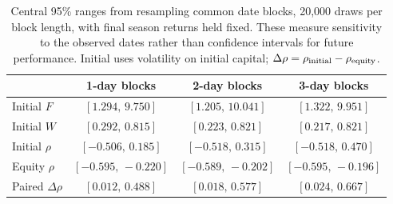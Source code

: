\begin{table}[ht]
\centering\small
\caption{Central 95\% ranges from resampling common date blocks,
20,000 draws per block length, with final season returns held fixed.
These measure sensitivity to the observed dates rather than confidence
intervals for future performance. Initial uses volatility on initial
capital; $\Delta\rho=\rho_{\rm initial}-\rho_{\rm equity}$.}
\label{tab:dayweights}
\begin{tabular}{lccc}
\toprule
 & 1-day blocks & 2-day blocks & 3-day blocks \\
\midrule
Initial $F$ & $[1.294,\,9.750]$ & $[1.205,\,10.041]$ & $[1.322,\,9.951]$ \\
Initial $W$ & $[0.292,\,0.815]$ & $[0.223,\,0.821]$ & $[0.217,\,0.821]$ \\
Initial $\rho$ & $[-0.506,\,0.185]$ & $[-0.518,\,0.315]$ & $[-0.518,\,0.470]$ \\
Equity $\rho$ & $[-0.595,\,-0.220]$ & $[-0.589,\,-0.202]$ & $[-0.595,\,-0.196]$ \\
Paired $\Delta\rho$ & $[0.012,\,0.488]$ & $[0.018,\,0.577]$ & $[0.024,\,0.667]$ \\
\bottomrule
\end{tabular}
\end{table}
